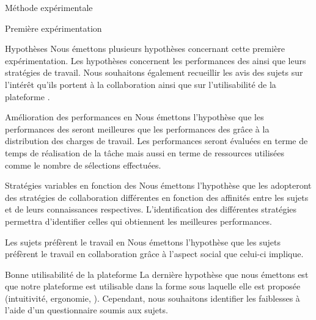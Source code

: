 \documentclass[myfrancais,ngerman,english,french]{mythesis}
\begin{document}
	\begin{mychapter}{Méthode expérimentale}
		\begin{mysection}{Première expérimentation}
			\begin{mysubsection}{Hypothèses}
				Nous émettons plusieurs hypothèses concernant cette première expérimentation.
				Les hypothèses concernent les performances des  ainsi que leurs stratégies de travail.
				Nous souhaitons également recueillir les avis des sujets sur l'intérêt qu'ils portent à la collaboration ainsi que sur l'utilisabilité de la plateforme \myShaddock.
				\begin{myparagraph}{ Amélioration des performances en }
					Nous émettons l'hypothèse que les performances des  seront meilleures que les performances des  grâce à la distribution des charges de travail.
					Les performances seront évaluées en terme de temps de réalisation de la tâche mais aussi en terme de ressources utilisées comme le nombre de sélections effectuées.
				\end{myparagraph}
				\begin{myparagraph}{ Stratégies variables en fonction des }
					Nous émettons l'hypothèse que les  adopteront des stratégies de collaboration différentes en fonction des affinités entre les sujets et de leurs connaissances respectives.
					L'identification des différentes stratégies permettra d'identifier celles qui obtiennent les meilleures performances.
				\end{myparagraph}
				\begin{myparagraph}{ Les sujets préfèrent le travail en }
					Nous émettons l'hypothèse que les sujets préfèrent le travail en collaboration grâce à l'aspect social que celui-ci implique.
				\end{myparagraph}
				\begin{myparagraph}{ Bonne utilisabilité de la plateforme}
					La dernière hypothèse que nous émettons est que notre plateforme est utilisable dans la forme sous laquelle elle est proposée (intuitivité, ergonomie, \myetc).
					Cependant, nous souhaitons identifier les faiblesses à l'aide d'un questionnaire soumis aux sujets.

\end{myparagraph}
\end{mysubsection}
\end{mysection}
\end{mychapter}
\end{document}
